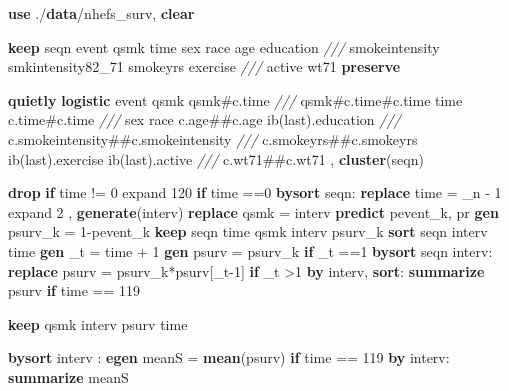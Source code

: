 \documentclass[
  10pt,
]{book}
\newenvironment{Shaded}{\begin{snugshade}}{\end{snugshade}}
\newcommand{\CommentTok}[1]{\textcolor[rgb]{0.56,0.35,0.01}{\textit{#1}}}
\newcommand{\DataTypeTok}[1]{\textcolor[rgb]{0.13,0.29,0.53}{#1}}
\newcommand{\FunctionTok}[1]{\textcolor[rgb]{0.00,0.00,0.00}{#1}}
\newcommand{\KeywordTok}[1]{\textcolor[rgb]{0.13,0.29,0.53}{\textbf{#1}}}
\newcommand{\NormalTok}[1]{#1}
\begin{document}
\begin{Shaded}
\begin{Highlighting}[]
\KeywordTok{use}\NormalTok{ ./}\KeywordTok{data}\NormalTok{/nhefs\_surv, }\KeywordTok{clear}

\KeywordTok{keep}\NormalTok{ seqn event qsmk time sex race age education }\CommentTok{///}
\NormalTok{  smokeintensity smkintensity82\_71  smokeyrs exercise }\CommentTok{///}
\NormalTok{  active wt71 }
\KeywordTok{preserve}
 
\KeywordTok{quietly} \KeywordTok{logistic}\NormalTok{ event qsmk qsmk\#c.time }\CommentTok{///}
\NormalTok{  qsmk\#c.time\#c.time time c.time\#c.time  }\CommentTok{///}
\NormalTok{    sex race c.age\#\#c.age ib(}\FunctionTok{last}\NormalTok{).education }\CommentTok{///}
\NormalTok{    c.smokeintensity\#\#c.smokeintensity }\CommentTok{///}
\NormalTok{    c.smokeyrs\#\#c.smokeyrs ib(}\FunctionTok{last}\NormalTok{).exercise ib(}\FunctionTok{last}\NormalTok{).active }\CommentTok{///}
\NormalTok{    c.wt71\#\#c.wt71 , }\KeywordTok{cluster}\NormalTok{(seqn) }
            
\KeywordTok{drop} \KeywordTok{if}\NormalTok{ time != 0}
\NormalTok{expand 120 }\KeywordTok{if}\NormalTok{ time ==0 }
\KeywordTok{bysort}\NormalTok{ seqn: }\KeywordTok{replace}\NormalTok{ time = }\DataTypeTok{\_n}\NormalTok{ {-} 1              }
\NormalTok{expand 2 , }\KeywordTok{generate}\NormalTok{(interv) }
\KeywordTok{replace}\NormalTok{ qsmk = interv        }
\KeywordTok{predict}\NormalTok{ pevent\_k, pr}
\KeywordTok{gen}\NormalTok{ psurv\_k = 1{-}pevent\_k}
\KeywordTok{keep}\NormalTok{ seqn  time qsmk interv psurv\_k                 }
\KeywordTok{sort}\NormalTok{ seqn interv time}
\KeywordTok{gen}\NormalTok{ \_t = time + 1}
\KeywordTok{gen}\NormalTok{ psurv = psurv\_k }\KeywordTok{if}\NormalTok{ \_t ==1       }
\KeywordTok{bysort}\NormalTok{ seqn interv: }\KeywordTok{replace}\NormalTok{ psurv = psurv\_k*psurv[\_t{-}1] }\KeywordTok{if}\NormalTok{ \_t \textgreater{}1 }
\KeywordTok{by}\NormalTok{ interv, }\KeywordTok{sort}\NormalTok{: }\KeywordTok{summarize}\NormalTok{ psurv }\KeywordTok{if}\NormalTok{ time == 119}

\KeywordTok{keep}\NormalTok{ qsmk interv psurv time   }
        
\KeywordTok{bysort}\NormalTok{ interv : }\KeywordTok{egen}\NormalTok{ meanS = }\KeywordTok{mean}\NormalTok{(psurv) }\KeywordTok{if}\NormalTok{ time == 119}
\KeywordTok{by}\NormalTok{ interv: }\KeywordTok{summarize}\NormalTok{ meanS}


\end{Highlighting}
\end{Shaded}
\end{document}
